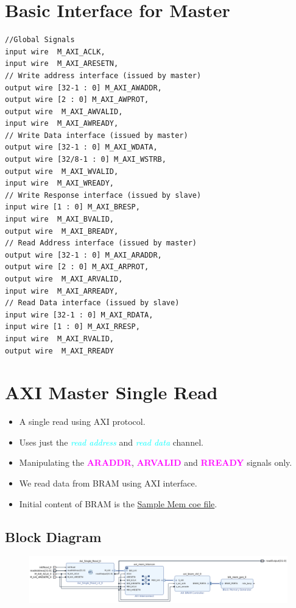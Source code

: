 \documentclass{article}
\newcommand{\chFormat}[1]{\emph{\textcolor{cyan}{#1}}}
\newcommand{\AXISignals}[1]{\textbf{\textcolor{magenta}{#1}}}
\begin{document}
\section{Basic Interface for Master}
\begin{verbatim}
//Global Signals
input wire  M_AXI_ACLK,
input wire  M_AXI_ARESETN,
// Write address interface (issued by master)
output wire [32-1 : 0] M_AXI_AWADDR,
output wire [2 : 0] M_AXI_AWPROT,
output wire  M_AXI_AWVALID,
input wire  M_AXI_AWREADY,
// Write Data interface (issued by master)
output wire [32-1 : 0] M_AXI_WDATA,
output wire [32/8-1 : 0] M_AXI_WSTRB,
output wire  M_AXI_WVALID,
input wire  M_AXI_WREADY,
// Write Response interface (issued by slave)
input wire [1 : 0] M_AXI_BRESP,
input wire  M_AXI_BVALID,
output wire  M_AXI_BREADY,
// Read Address interface (issued by master)
output wire [32-1 : 0] M_AXI_ARADDR,
output wire [2 : 0] M_AXI_ARPROT,
output wire  M_AXI_ARVALID,
input wire  M_AXI_ARREADY,
// Read Data interface (issued by slave)
input wire [32-1 : 0] M_AXI_RDATA,
input wire [1 : 0] M_AXI_RRESP,
input wire  M_AXI_RVALID,
output wire  M_AXI_RREADY
\end{verbatim}

\section{AXI Master Single Read}
\begin{itemize}
    \item A single read using AXI protocol.
    \item Uses just the \chFormat{read address} and \chFormat{read data} channel.
    \item Manipulating the \AXISignals{ARADDR}, \AXISignals{ARVALID} and \AXISignals{RREADY} signals only.
    \item We read data from BRAM using AXI interface.
    \item Initial content of BRAM is the \href{./MemFiles/SampleMemFile.coe}{Sample Mem coe file}.
\end{itemize}
\subsection{Block Diagram}
\begin{figure}[H]
    \centering
    \includegraphics[width=1\textwidth]{Resources/SingleReadBRAM.png}
\end{figure}
\end{document}
